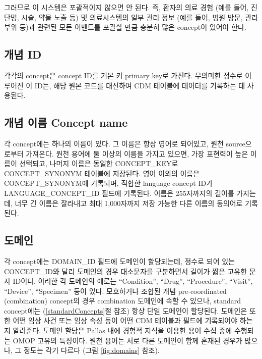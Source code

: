 \documentclass[10.5pt]{book}
\theoremstyle{definition}
\theoremstyle{definition}
\theoremstyle{definition}
\theoremstyle{remark}
\begin{document}
그러므로 이 시스템은 포괄적이지 않으면 안 된다. 즉, 환자의 의료 경험
(예를 들어, 진단명, 시술, 약물 노출 등) 및 의료시스템의 일부 관리 정보
(예를 들어, 병원 방문, 관리 부위 등)과 관련된 모든 이벤트를 포괄할 만큼
충분히 많은 concept이 있어야 한다.

\subsection{개념 ID}\label{-id}

각각의 concept은 concept ID를 기본 키 primary key로 가진다. 무의미한
정수로 이루어진 이 ID는, 해당 원본 코드를 대신하여 CDM 테이블에 데이터를
기록하는 데 사용된다.

\subsection{개념 이름 Concept name}\label{--concept-name}

각 concept에는 하나의 이름이 있다. 그 이름은 항상 영어로 되어있고, 원천
source으로부터 가져온다. 원천 용어에 둘 이상의 이름을 가지고 있으면,
가장 표현력이 높은 이름이 선택되고, 나머지 이름은 동일한 CONCEPT\_KEY로
CONCEPT\_SYNONYM 테이블에 저장된다. 영어 이외의 이름은
CONCEPT\_SYNONYM에 기록되며, 적합한 language concept ID가
LANGUAGE\_CONCEPT\_ID 필드에 기록된다. 이름은 255자까지의 길이를
가지는데, 너무 긴 이름은 잘라내고 최대 1,000자까지 저장 가능한 다른
이름의 동의어로 기록된다.

\subsection{도메인}\label{conceptDomains}

각 concept에는 DOMAIN\_ID 필드에 도메인이 할당되는데, 정수로 되어 있는
CONCEPT\_ID와 달리 도메인의 경우 대소문자를 구분하면서 길이가 짧은
고유한 문자 ID이다. 이러한 각 도메인의 예로는 ``Condition'', ``Drug'',
``Procedure'', ``Visit'', ``Device'', ``Specimen'' 등이 있다. 모호하거나
조합된 개념 pre-coordinated (combination) concept의 경우 combination
도메인에 속할 수 있으나, standard concept에는 (\ref{standardConcepts}절
참조) 항상 단일 도메인이 할당된다. 도메인은 또한 어떤 임상 사건 또는
임상 속성 등이 어떤 CDM 테이블과 필드에 기록되어야 하는지 알려준다.
도메인 할당은 \href{https://github.com/ohDSI/vocabulary-v5.0}{Pallas}
내에 경험적 지식을 이용한 용어 수집 중에 수행되는 OMOP 고유의 특징이다.
원천 용어는 서로 다른 도메인이 함께 혼재된 경우가 많으나, 그 정도는 각기
다르다 (그림 \ref{fig:domains} 참조). 
\end{document}
